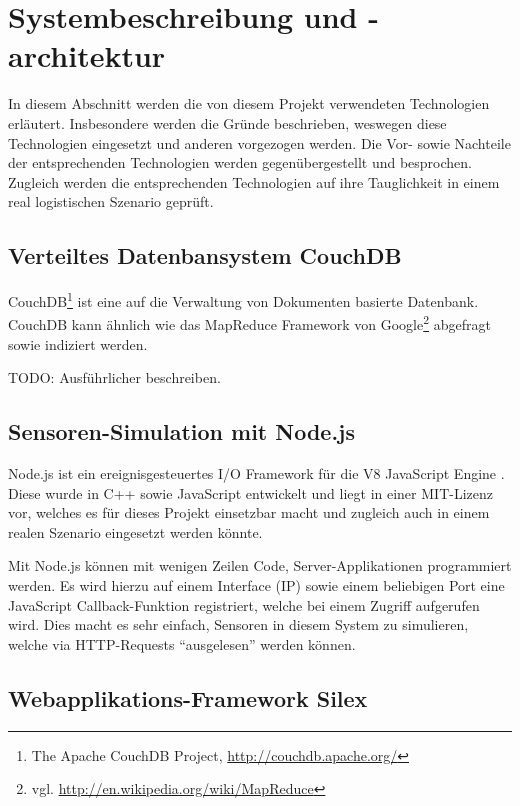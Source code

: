 \section{Systembeschreibung und -architektur}
\label{sec:technology}

In diesem Abschnitt werden die von diesem Projekt verwendeten Technologien erläutert. Insbesondere werden die Gründe beschrieben, weswegen diese Technologien eingesetzt und anderen vorgezogen werden. Die Vor- sowie Nachteile der entsprechenden Technologien werden gegenübergestellt und besprochen. Zugleich werden die entsprechenden Technologien auf ihre Tauglichkeit in einem real logistischen Szenario geprüft.

\subsection{Verteiltes Datenbansystem CouchDB}
\label{subsec:couchdb}
CouchDB\footnote{The Apache CouchDB Project, \url{http://couchdb.apache.org/}} ist eine auf die Verwaltung von Dokumenten basierte Datenbank. CouchDB kann ähnlich wie das MapReduce Framework von Google\footnote{vgl. \url{http://en.wikipedia.org/wiki/MapReduce}} abgefragt sowie indiziert werden.

TODO: Ausführlicher beschreiben.

\subsection{Sensoren-Simulation mit Node.js}
\label{subsec:nodejs}

Node.js ist ein ereignisgesteuertes I/O Framework für die V8 JavaScript Engine \cite{Wikipedia10a}. Diese wurde in C++ sowie JavaScript entwickelt und liegt in einer MIT-Lizenz vor, welches es für dieses Projekt einsetzbar macht und zugleich auch in einem realen Szenario eingesetzt werden könnte.

Mit Node.js können mit wenigen Zeilen Code, Server-Applikationen programmiert werden. Es wird hierzu auf einem Interface (IP) sowie einem beliebigen Port eine JavaScript Callback-Funktion registriert, welche bei einem Zugriff aufgerufen wird. Dies macht es sehr einfach, Sensoren in diesem System zu simulieren, welche via HTTP-Requests ``ausgelesen'' werden können.


\subsection{Webapplikations-Framework Silex}

